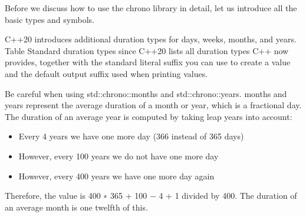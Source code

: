 
Before we discuss how to use the chrono library in detail, let us introduce all the basic types and symbols.


C++20 introduces additional duration types for days, weeks, months, and years. Table Standard duration types since C++20 lists all duration types C++ now provides, together with the standard literal suffix you can use to create a value and the default output suffix used when printing values.

Be careful when using std::chrono::months and std::chrono::years. months and years represent the average duration of a month or year, which is a fractional day. The duration of an average year is computed by taking leap years into account:

\begin{itemize}
\item 
Every 4 years we have one more day (366 instead of 365 days)

\item 
However, every 100 years we do not have one more day

\item 
However, every 400 years we have one more day again
\end{itemize}

Therefore, the value is 400 ∗ 365 + 100 − 4 + 1 divided by 400. The duration of an average month is one twelfth of this.

